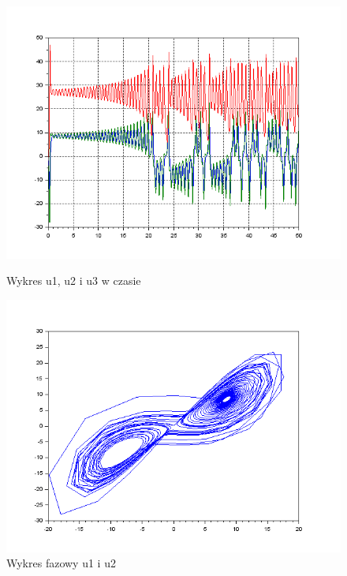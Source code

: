 \documentclass[12pt]{article}
\begin{document}
\begin{figure}[H]
  \centering
  \begin{minipage}[b]{0.49\textwidth}
    \includegraphics[scale=0.4]{./img/6--111-xy}
    \caption{Wykres u1, u2 i u3 w czasie}
    \end{minipage}
  \hfill
  \begin{minipage}[b]{0.49\textwidth}
    \includegraphics[scale=0.4]{./img/6--111-phase-1-2}
    \caption{Wykres fazowy u1 i u2}
  \end{minipage}
\begin{minipage}[b]{0.49\textwidth}

\end{minipage}
\end{figure}
\end{document}
